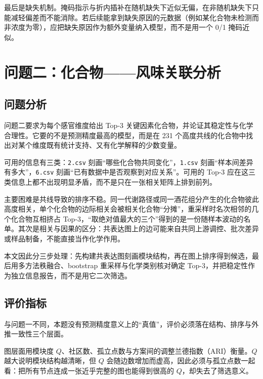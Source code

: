 ﻿\documentclass[UTF8,a4paper,zihao=-4]{ctexart}
\numberwithin{figure}{section}
\numberwithin{table}{section}
\numberwithin{equation}{section}
\newcommand{\file}[1]{\texttt{#1}}
\begin{document}
最后是缺失机制。掩码指示与折内插补在随机缺失下近似无偏，在非随机缺失下只能减轻偏差而不能消除。若后续能拿到缺失原因的元数据（例如某化合物未检测而非浓度为零），应把缺失原因作为额外变量纳入模型，而不是用一个 0/1 掩码近似。

\section{问题二：化合物——风味关联分析}
\label{sec:q2}

\subsection{问题分析}

问题二要求为每个感官维度给出 Top-3 关键因素化合物，并论证其稳定性与化学合理性。它要的不是预测精度最高的模型，而是在 231 个高度共线的化合物中找出对某个维度既有统计支持、又有化学解释的少数变量。

可用的信息有三类：\file{2.csv} 刻画“哪些化合物共同变化”，\file{1.csv} 刻画“样本间差异有多大”，\file{6.csv} 刻画“已有数据中是否观察到对应关系”。可用的 Top-3 应在这三类信息上都不出现明显矛盾，而不是只在一张相关矩阵上排到前列。

主要困难是共线导致的排序不稳。同一代谢路径或同一酒花组分产生的化合物彼此高度相关，单个化合物的边际相关会被相关化合物“分摊”，重采样时名次相邻的几个化合物互相挤占 Top-3，“取绝对值最大的三个”得到的是一份随样本波动的名单。其次是相关与因果的区分：共表达图上的边可能来自共同上游调控、批次差异或样品制备，不能直接当作化学作用。

本文因此分三步处理：先构建共表达图刻画模块结构，再在图上排序得到候选，最后用多方法秩融合、bootstrap 重采样\cite{efron1979}与化学类别核对确定 Top-3，并把稳定性作为独立信息报告，而不是用它二次筛选。

\subsection{评价指标}

与问题一不同，本题没有预测精度意义上的“真值”，评价必须落在结构、排序与外推一致性三个层面。

图层面用模块度 $Q$、社区数、孤立点数与方案间的调整兰德指数（ARI）衡量。$Q$ 越大说明模块结构越清晰，但 $Q$ 会随边数增加而虚高，因此必须与孤立点数一起看：把所有节点连成一张近乎完整的图也能得到很高的 $Q$，却失去了筛选意义。
\end{document}
